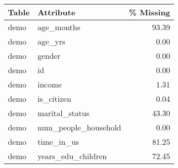 \begin{tabular}{llr}
\toprule
 Table &                Attribute &  \% Missing \\
\midrule
  demo &               age\_months &      93.39 \\
  demo &                  age\_yrs &       0.00 \\
  demo &                   gender &       0.00 \\
  demo &                       id &       0.00 \\
  demo &                   income &       1.31 \\
  demo &               is\_citizen &       0.04 \\
  demo &           marital\_status &      43.30 \\
  demo &     num\_people\_household &       0.00 \\
  demo &               time\_in\_us &      81.25 \\
  demo &       years\_edu\_children &      72.45 \\
\bottomrule
\end{tabular}
